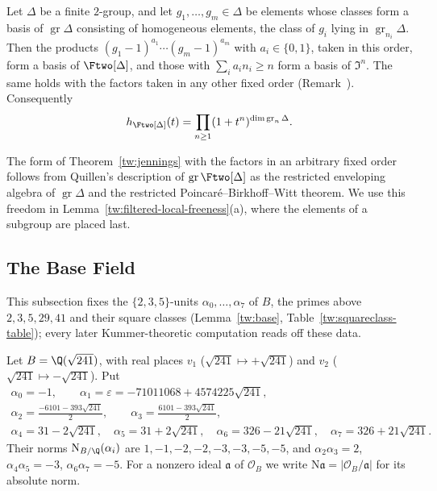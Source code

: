 \begin{theorem}\label{tw:jennings}
Let $\Delta$ be a finite $2$-group, and let $g_1,\dots,g_m\in\Delta$ be
elements whose classes form a basis of $\operatorname{gr}\Delta$ consisting of
homogeneous elements, the class of $g_i$ lying in
$\operatorname{gr}_{n_i}\Delta$. Then the products
$(g_1-1)^{a_1}\cdots(g_m-1)^{a_m}$ with $a_i\in\{0,1\}$, taken in this order,
form a basis of $\Ftwo[\Delta]$, and those with $\sum_ia_in_i\ge n$ form a
basis of $\mathfrak I^n$. The same holds with the factors taken in any other
fixed order (Remark~). Consequently
\[
 h_{\Ftwo[\Delta]}(t)=\prod_{n\ge1}(1+t^n)^{\dim\operatorname{gr}_n\Delta}.
\]
\end{theorem}

\begin{remark}\label{tw:jennings-order}
The form of Theorem~\ref{tw:jennings} with the factors in an arbitrary fixed
order follows from Quillen's description of $\operatorname{gr}\Ftwo[\Delta]$
as the restricted enveloping algebra of $\operatorname{gr}\Delta$
\cite{Quillen} and the restricted Poincar\'e--Birkhoff--Witt theorem. We use
this freedom in Lemma~\ref{tw:filtered-local-freeness}(a), where the elements
of a subgroup are placed last.
\end{remark}

\subsection{The Base Field}\label{tw:base-section}
This subsection fixes the $\{2,3,5\}$-units $\alpha_0,\dots,\alpha_7$ of
$B$, the primes above $2,3,5,29,41$ and their square classes
(Lemma~\ref{tw:base}, Table~\ref{tw:squareclass-table}); every later
Kummer-theoretic computation reads off these data.

Let $B=\Q(\sqrt{241})$, with real places $v_1$ ($\sqrt{241}\mapsto+\sqrt{241}$)
and $v_2$ ($\sqrt{241}\mapsto-\sqrt{241}$). Put
\begin{equation}\label{tw:alpha}
\begin{gathered}
 \alpha_0=-1,\qquad \alpha_1=\varepsilon=-71011068+4574225\sqrt{241},\\
 \alpha_2=\tfrac{-6101-393\sqrt{241}}2,\qquad
 \alpha_3=\tfrac{6101-393\sqrt{241}}2,\\
 \alpha_4=31-2\sqrt{241},\quad \alpha_5=31+2\sqrt{241},\quad
 \alpha_6=326-21\sqrt{241},\quad \alpha_7=326+21\sqrt{241}.
\end{gathered}
\end{equation}
Their norms $\mathrm N_{B/\Q}(\alpha_i)$ are $1,-1,-2,-2,-3,-3,-5,-5$, and
$\alpha_2\alpha_3=2$, $\alpha_4\alpha_5=-3$, $\alpha_6\alpha_7=-5$. For a
nonzero ideal $\mathfrak a$ of $\mathcal O_B$ we write
$\mathrm N\mathfrak a=|\mathcal O_B/\mathfrak a|$ for its absolute norm.

